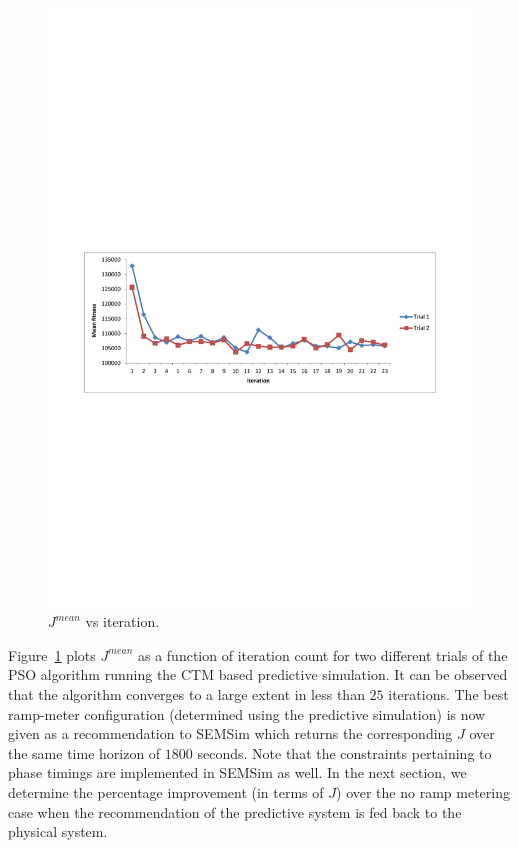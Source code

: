 \documentclass[12pt]{article}
\begin{document}
\begin{figure}[!htbp]
    \centering
    \includegraphics[clip=false,scale=0.75]{images/CTM-improvement-PSO.pdf}
   \caption{$J^{mean}$ vs iteration.}
   \label{fig:ctm-improvement}
 \end{figure}
  
Figure~\ref{fig:ctm-improvement} plots $J^{mean}$ as a function of iteration count for two different trials of the PSO algorithm running the CTM based predictive simulation. It can be observed that the algorithm converges to a large extent in less than $25$ iterations. 
The best ramp-meter configuration (determined using the predictive simulation) is now given as a recommendation to SEMSim which returns the corresponding $J$ over the same time horizon of $1800$ seconds. Note that the constraints pertaining to phase timings are implemented in SEMSim as well. In the next section, we determine the percentage improvement (in terms of $J$) over the no ramp metering case when the recommendation of the predictive system is fed back to the physical system.
\end{document}
